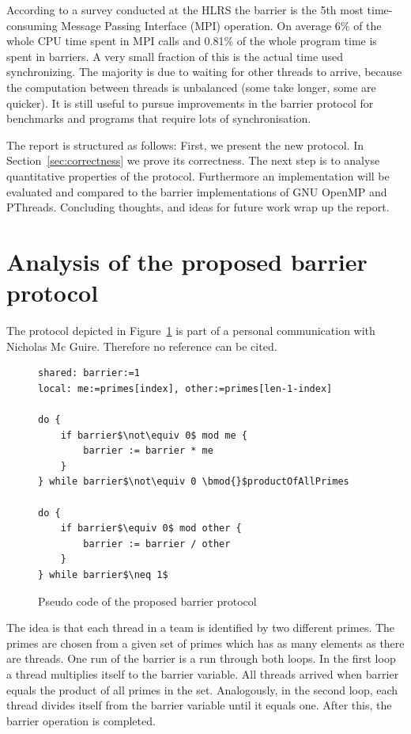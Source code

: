 \documentclass[a4paper, 10pt]{article}
\begin{document}
According to a survey conducted at the HLRS\cite{rab00} the barrier is the 5th most time-consuming Message Passing Interface (MPI)\cite{mpi} operation. On average 6\% of the whole CPU time spent in MPI calls and 0.81\% of the whole program time is spent in barriers. A very small fraction of this is the actual time used synchronizing. The majority is due to waiting for other threads to arrive, because the computation between threads is unbalanced (some take longer, some are quicker). It is still useful to pursue improvements in the barrier protocol for benchmarks and programs that require lots of synchronisation.

The report is structured as follows: First, we present the new protocol. In Section~\ref{sec:correctness} we prove its correctness. The next step is to analyse quantitative properties of the protocol. Furthermore an implementation will be evaluated and compared to the barrier implementations of GNU OpenMP\cite{gomp} and PThreads\cite{glibc}. Concluding thoughts, and ideas for future work wrap up the report.

\section{Analysis of the proposed barrier protocol}
The protocol depicted in Figure~\ref{fig:original-barrier-source-code} is part of a personal communication with Nicholas Mc Guire. Therefore no reference can be cited.

\begin{figure}[htbp]
	\centering
	\begin{lstlisting}[mathescape]
shared: barrier:=1
local: me:=primes[index], other:=primes[len-1-index]

do {
	if barrier$\not\equiv 0$ mod me {
		barrier := barrier * me
	}
} while barrier$\not\equiv 0 \bmod{}$productOfAllPrimes

do {
	if barrier$\equiv 0$ mod other {
		barrier := barrier / other
	}
} while barrier$\neq 1$
	\end{lstlisting}
	\caption{Pseudo code of the proposed barrier protocol}
	\label{fig:original-barrier-source-code}
\end{figure}
The idea is that each thread in a team is identified by two different primes. The primes are chosen from a given set of primes which has
as many elements as there are threads. One run of the barrier is a run through both loops. In the first loop a thread multiplies itself to the barrier variable. All threads arrived when barrier equals the product of all primes in the set. Analogously, in the second loop, each thread divides itself from the barrier variable until it equals one. After this, the barrier operation is completed.
\end{document}
